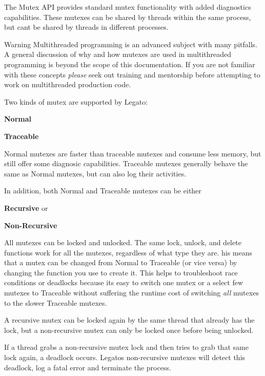 The Mutex A\+P\+I provides standard mutex functionality with added diagnostics capabilities. These mutexes can be shared by threads within the same process, but can\textquotesingle{}t be shared by threads in different processes.

\begin{DoxyWarning}{Warning}
Multithreaded programming is an advanced subject with many pitfalls. A general discussion of why and how mutexes are used in multithreaded programming is beyond the scope of this documentation. If you are not familiar with these concepts {\itshape please} seek out training and mentorship before attempting to work on multithreaded production code.
\end{DoxyWarning}
Two kinds of mutex are supported by Legato\+:
\begin{DoxyItemize}
\item {\bfseries Normal} 
\item {\bfseries Traceable} 
\end{DoxyItemize}

Normal mutexes are faster than traceable mutexes and consume less memory, but still offer some diagnosic capabilities. Traceable mutexes generally behave the same as Normal mutexes, but can also log their activities.

In addition, both Normal and Traceable mutexes can be either
\begin{DoxyItemize}
\item {\bfseries Recursive} or
\item {\bfseries Non-\/\+Recursive} 
\end{DoxyItemize}

All mutexes can be locked and unlocked. The same lock, unlock, and delete functions work for all the mutexes, regardless of what type they are. his means that a mutex can be changed from Normal to Traceable (or vice versa) by changing the function you use to create it. This helps to troubleshoot race conditions or deadlocks because it\textquotesingle{}s easy to switch one mutex or a select few mutexes to Traceable without suffering the runtime cost of switching {\itshape all} mutexes to the slower Traceable mutexes.

A recursive mutex can be locked again by the same thread that already has the lock, but a non-\/recursive mutex can only be locked once before being unlocked.

If a thread grabs a non-\/recursive mutex lock and then tries to grab that same lock again, a deadlock occurs. Legato\textquotesingle{}s non-\/recursive mutexes will detect this deadlock, log a fatal error and terminate the process.

